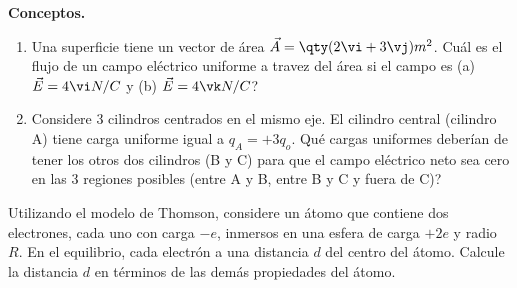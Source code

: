 \begin{mdframed}[style=warning]
	\begin{ejercicio}
		\textbf{Conceptos.}
		\begin{enumerate}
			\item Una superficie tiene un vector de área $\vec{A} = \qty(2\vi + 3\vj)m^2$. Cuál es el flujo de un campo eléctrico uniforme a travez del área si el campo es (a) $\vec{E} = 4\vi N/C$ y (b) $\vec{E} = 4\vk N/C$?
			\item Considere 3 cilindros centrados en el mismo eje. El cilindro central (cilindro A) tiene carga uniforme igual a $q_A = +3q_o$. Qué cargas uniformes deberían de tener los otros dos cilindros (B y C) para que el campo eléctrico neto sea cero en las 3 regiones posibles (entre A y B, entre B y C y fuera de C)?
		\end{enumerate}
	\end{ejercicio}
\end{mdframed}






\begin{mdframed}[style=warning]
	\begin{ejercicio}
		Utilizando el modelo de Thomson, considere un átomo que contiene dos electrones, cada uno con carga $-e$, inmersos en una esfera de carga $+2e$ y radio $R$. En el equilibrio, cada electrón a una distancia $d$ del centro del átomo. Calcule la distancia $d$ en términos de las demás propiedades del átomo.
	\end{ejercicio}
\end{mdframed}











